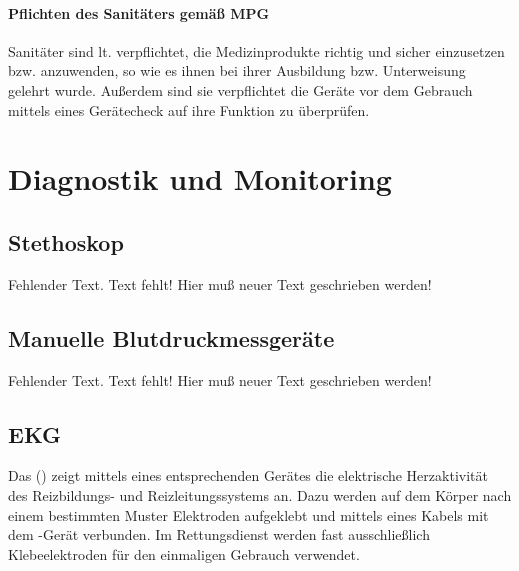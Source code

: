 \paragraph{Pflichten des Sanitäters gemäß MPG}

Sanitäter sind lt.  verpflichtet, die
Medizinprodukte richtig und sicher einzusetzen bzw. anzuwenden, so wie es
ihnen bei ihrer Ausbildung bzw. Unterweisung gelehrt wurde.
Außerdem sind sie verpflichtet die Geräte vor dem Gebrauch
mittels eines Gerätecheck auf ihre Funktion zu überprüfen.


\section{Diagnostik und Monitoring}


\subsection{Stethoskop}
\begin{anfxerror}[author=GABS]{Fehlender Text.}
Text fehlt! Hier muß neuer Text geschrieben werden!
\end{anfxerror}

\subsection{Manuelle Blutdruckmessgeräte}
\begin{anfxerror}[author=GABS]{Fehlender Text.}
Text fehlt! Hier muß neuer Text geschrieben werden!
\end{anfxerror}




\subsection{EKG}
\label{topic:ekg}

Das  () zeigt mittels eines
entsprechenden Gerätes die elektrische Herzaktivität des
Reizbildungs- und Reizleitungssystems an. Dazu werden auf
dem Körper nach einem bestimmten Muster Elektroden
aufgeklebt und mittels eines Kabels mit dem -Gerät
verbunden. Im Rettungsdienst werden fast ausschließlich
Klebeelektroden für den einmaligen Gebrauch verwendet. 

